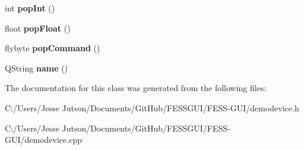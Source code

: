 \begin{DoxyCompactItemize}
\hypertarget{class_demo_device_a69f90f468dc4ff767b74f6fd90ad6b65}{}\label{class_demo_device_a69f90f468dc4ff767b74f6fd90ad6b65} 
int {\bfseries pop\+Int} ()
\item 
\hypertarget{class_demo_device_afc2d0b3c5f039337057b009919db6942}{}\label{class_demo_device_afc2d0b3c5f039337057b009919db6942} 
float {\bfseries pop\+Float} ()
\item 
\hypertarget{class_demo_device_a5900309bc171514b76b94e646474cde7}{}\label{class_demo_device_a5900309bc171514b76b94e646474cde7} 
flybyte {\bfseries pop\+Command} ()
\item 
\hypertarget{class_demo_device_acde538bd5a71a8d4df6293876169545c}{}\label{class_demo_device_acde538bd5a71a8d4df6293876169545c} 
Q\+String {\bfseries name} ()
\end{DoxyCompactItemize}


The documentation for this class was generated from the following files\+:\begin{DoxyCompactItemize}
\item 
C\+:/\+Users/\+Jesse Jutson/\+Documents/\+Git\+Hub/\+F\+E\+S\+S\+G\+U\+I/\+F\+E\+S\+S-\/\+G\+U\+I/demodevice.\+h\item 
C\+:/\+Users/\+Jesse Jutson/\+Documents/\+Git\+Hub/\+F\+E\+S\+S\+G\+U\+I/\+F\+E\+S\+S-\/\+G\+U\+I/demodevice.\+cpp\end{DoxyCompactItemize}
